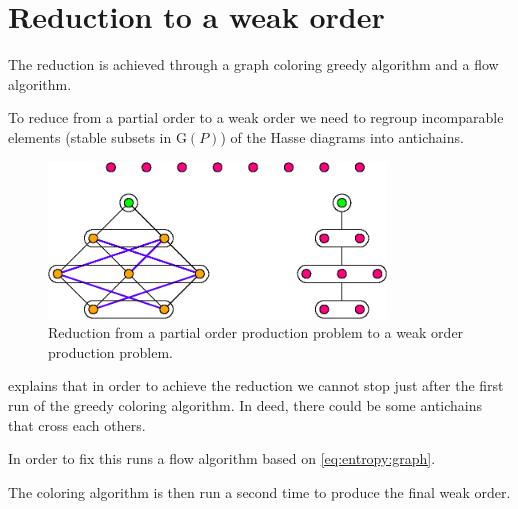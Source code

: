 \section{Reduction to a weak order}
\label{tree:pop:reduction}


The reduction is achieved through a graph coloring greedy algorithm and a flow algorithm.

To reduce from a partial order to a weak order we need to regroup incomparable elements (stable subsets in $\text{G}(P)$) of the Hasse diagrams into antichains.

\begin{figure}
	\centering
	\includegraphics[width=0.8\textwidth]{fig/pop-reduction:diag}
	\caption{\label{fig:pop-reduction:diag} Reduction from a partial order production problem to a weak order production problem.}
\end{figure}

\cite{jcardin1} explains that in order to achieve the reduction we cannot stop just after the first run of the greedy coloring algorithm. In deed, there could be some antichains that cross each others.

In order to fix this \cite{jcardin1} runs a flow algorithm based on \ref{eq:entropy:graph}.

The coloring algorithm is then run a second time to produce the final weak order.